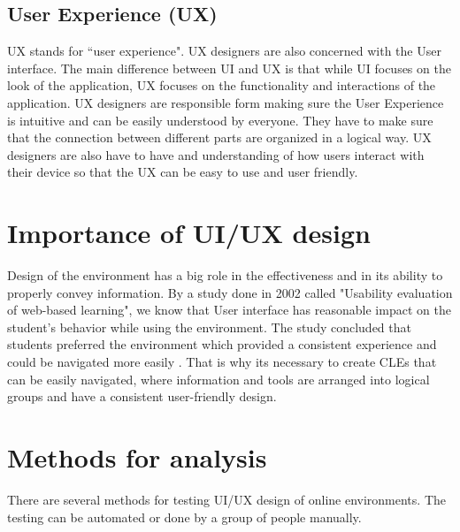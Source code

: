 \documentclass[10pt,english,a4paper]{article} %
\begin{document}
\subsection{User Experience (UX)}
UX stands for ``user experience". UX designers are also concerned with the User interface. \cite{theymakedesign_2019_what}
The main difference between UI and UX is that while UI focuses on the look of the application,
UX focuses on the functionality and interactions of the application. UX designers are 
responsible form making sure the User Experience is intuitive and can be easily understood by everyone.
They have to make sure that the connection between different parts are organized in a logical way.
UX designers are also have to have and understanding of how users interact with their
device so that the UX can be easy to use and user friendly. \cite{theymakedesign_2019_what}

\section{Importance of UI/UX design}\label{importance}
Design of the environment has a big role in the effectiveness and in 
its ability to properly convey information. \cite{ui/ux}
By a study done in 2002 called "Usability evaluation of web-based learning", we know that User interface
has reasonable impact on the student's behavior while using the environment.\cite{wesson_2002_usability}
The study concluded that students preferred the environment which provided a consistent experience and could be navigated more easily
\cite{wesson_2002_usability}. That is why its necessary to create CLEs that can be easily navigated,
where information and tools are arranged into logical groups and have a consistent user-friendly design.




\section{Methods for analysis}\label{methods}
There are several methods for testing UI/UX design of online environments. The testing 
can be automated or done by a group of people manually.
\end{document}
